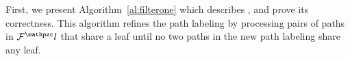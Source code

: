 
First, we present Algorithm~\ref{al:filterone} which describes \filteri, and prove its correctness.  This algorithm refines the
path labeling by processing pairs of paths in $\cF^\cl$ that share a
leaf until no two paths in the new path labeling share any leaf.


